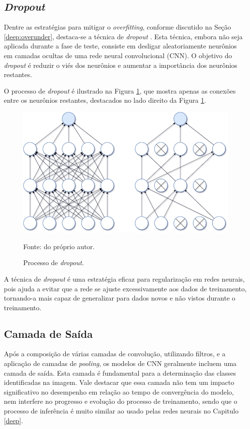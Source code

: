 \subsection{\textit{Dropout}}
\label{cnn:dropout}

Dentre as estratégias para mitigar o \textit{overfitting}, conforme discutido na Seção \ref{deep:overunder}, destaca-se a técnica de \textit{dropout} \citep{Goodfellow2016}. Esta técnica, embora não seja aplicada durante a fase de teste, consiste em desligar aleatoriamente neurônios em camadas ocultas de uma rede neural convolucional (CNN). O objetivo do \textit{dropout} é reduzir o viés dos neurônios e aumentar a importância dos neurônios restantes.

O processo de \textit{dropout} é ilustrado na Figura \ref{cnn:fig:9}, que mostra apenas as conexões entre os neurônios restantes, destacados no lado direito da Figura \ref{cnn:fig:9}.

\begin{figure}[H]
    \centering
    \caption{Processo de \textit{dropout}.}
    \includegraphics[width=1\linewidth]{recursos/imagens/deep/dropout.png}
    \label{cnn:fig:9}

     Fonte: do próprio autor.
\end{figure}

A técnica de \textit{dropout} é uma estratégia eficaz para regularização em redes neurais, pois ajuda a evitar que a rede se ajuste excessivamente aos dados de treinamento, tornando-a mais capaz de generalizar para dados novos e não vistos durante o treinamento.

\subsection{Camada de Saída}
\label{cnn:output}
Após a composição de várias camadas de convolução, utilizando filtros, e a aplicação de camadas de \textit{pooling}, os modelos de CNN geralmente incluem uma camada de saída. Esta camada é fundamental para a determinação das classes identificadas na imagem. Vale destacar que essa camada não tem um impacto significativo no desempenho em relação ao tempo de convergência do modelo, nem interfere no progresso e evolução do processo de treinamento, sendo que o processo de inferência é muito similar ao usado pelas redes neurais no Capitulo \ref{deep}.

